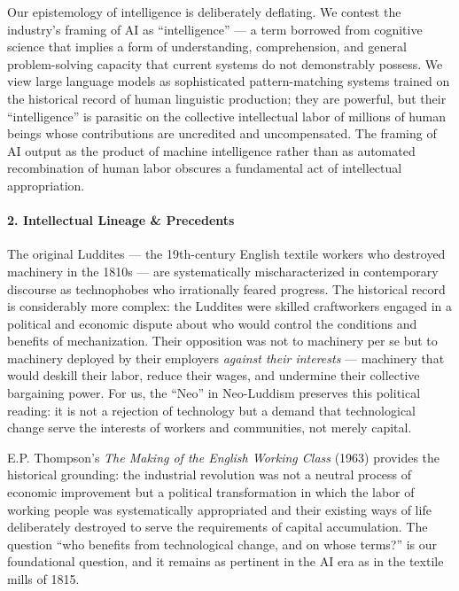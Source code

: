 Our epistemology of intelligence is deliberately deflating. We contest
the industry's framing of AI as ``intelligence'' --- a term borrowed
from cognitive science that implies a form of understanding,
comprehension, and general problem-solving capacity that current systems
do not demonstrably possess. We view large language models as
sophisticated pattern-matching systems trained on the historical record
of human linguistic production; they are powerful, but their
``intelligence'' is parasitic on the collective intellectual labor of
millions of human beings whose contributions are uncredited and
uncompensated. The framing of AI output as the product of machine
intelligence rather than as automated recombination of human labor
obscures a fundamental act of intellectual appropriation.

\paragraph{2. Intellectual Lineage \&
Precedents}\label{intellectual-lineage-precedents-6}

The original Luddites --- the 19th-century English textile workers who
destroyed machinery in the 1810s --- are systematically mischaracterized
in contemporary discourse as technophobes who irrationally feared
progress. The historical record is considerably more complex: the
Luddites were skilled craftworkers engaged in a political and economic
dispute about who would control the conditions and benefits of
mechanization. Their opposition was not to machinery per se but to
machinery deployed by their employers \emph{against their interests} ---
machinery that would deskill their labor, reduce their wages, and
undermine their collective bargaining power. For us, the ``Neo'' in
Neo-Luddism preserves this political reading: it is not a rejection of
technology but a demand that technological change serve the interests of
workers and communities, not merely capital.

E.P. Thompson's \emph{The Making of the English Working Class} (1963)
provides the historical grounding: the industrial revolution was not a
neutral process of economic improvement but a political transformation
in which the labor of working people was systematically appropriated and
their existing ways of life deliberately destroyed to serve the
requirements of capital accumulation. The question ``who benefits from
technological change, and on whose terms?'' is our foundational
question, and it remains as pertinent in the AI era as in the textile
mills of 1815.

